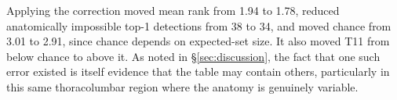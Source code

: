 Applying the correction moved mean rank from 1.94 to 1.78, reduced anatomically
impossible top-1 detections from 38 to 34, and moved chance from 3.01 to 2.91,
since chance depends on expected-set size. It also moved T11 from below chance to
above it. As noted in \S\ref{sec:discussion}, the fact that one such error existed
is itself evidence that the table may contain others, particularly in this same
thoracolumbar region where the anatomy is genuinely variable.
